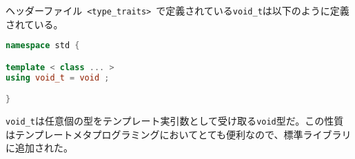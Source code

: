 %

ヘッダーファイル~\lstinline!<type_traits>!~で定義されている\lstinline!void_t!は以下のように定義されている。

\begin{lstlisting}[language=C++]
namespace std {

template < class ... >
using void_t = void ;

}
\end{lstlisting}

\lstinline!void_t!は任意個の型をテンプレート実引数として受け取る\lstinline!void!型だ。この性質はテンプレートメタプログラミングにおいてとても便利なので、標準ライブラリに追加された。

